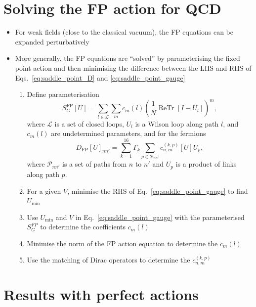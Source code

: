 \section{Solving the FP action for QCD}
\begin{itemize}
    \item For weak fields (close to the classical vacuum), the FP equations can be expanded perturbatively
    \item More generally, the FP equations are ``solved'' by parameterising the fixed point action and then minimising the difference between the LHS and RHS of Eqs.~\eqref{eq:saddle_point_D} and \eqref{eq:saddle_point_gauge}
    \begin{enumerate}
        \item Define parameterisation
        \begin{equation}
            S_G^\text{FP}[U] = \sum_{l \in \mathcal{L}}\sum_m c_m(l)\left(\frac{1}{N}\operatorname{ReTr}[I - U_l]\right)^m,
        \end{equation}
        where $\mathcal{L}$ is a set of closed loops, $U_l$ is a Wilson loop along path $l$, and $c_m(l)$ are undetermined parameters, and for the fermions
        \begin{equation}
            D_\text{FP}[U]_{nn'} = \sum_{k=1}^{16}\Gamma_k \sum_{p \in \mathcal{P}_{nn'}}c^{(k,p)}_{n,m}[U]U_p,
        \end{equation}
        where $\mathcal{P}_{nn'}$ is a set of paths from $n$ to $n'$ and $U_p$ is a product of links along path $p$.
        \item For a given $V$, minimise the RHS of Eq.~\eqref{eq:saddle_point_gauge} to find $U_\text{min}$
        \item Use $U_\text{min}$ and $V$ in Eq.~\eqref{eq:saddle_point_gauge} with the parameterised $S_G^{FP}$ to determine the coefficients $c_m(l)$
        \item Minimise the norm of the FP action equation to determine the $c_m(l)$
        \item Use the matching of Dirac operators to determine the $c_{n,m}^{(k,p)}$
    \end{enumerate}
\end{itemize}
\section{Results with perfect actions}

